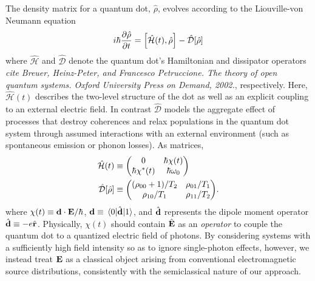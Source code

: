 \documentclass[conference]{IEEEtran}
\begin{document}
The density matrix for a quantum dot, $\hat{\rho}$, evolves according to the Liouville-von Neumann equation
\begin{equation}
  i \hbar \pdv{\hat{\rho}}{t} = \commutator{\hat{\mathcal{H}}(t)}{\hat{\rho}} - \hat{\mathcal{D}}\qty[\hat{\rho}]
  \label{eq:liouville}
\end{equation}
where $\hat{\mathcal{H}}$ and $\hat{\mathcal{D}}$ denote the quantum dot's Hamiltonian and dissipator operators {\it cite Breuer, Heinz-Peter, and Francesco Petruccione. The theory of open quantum systems. Oxford University Press on Demand, 2002.}, respectively.
Here, $\hat{\mathcal{H}}(t)$ describes the  two-level structure of the dot as well as an explicit coupling to an external electric field.
In contrast $\hat{\mathcal{D}}$ models the aggregate effect of processes that destroy coherences and relax populations in the quantum dot system through assumed interactions with an external environment (such as spontaneous emission or phonon losses).
As matrices,
\begin{subequations}
  \begin{align}
    \hat{\mathcal{H}}(t) &\equiv \mqty(0 & \hbar \chi(t) \\ \hbar \chi^*(t) & \hbar \omega_0) \label{eq:hamiltonian} \\
    \hat{\mathcal{D}}[\hat{\rho}] &\equiv \mqty((\rho_{00} + 1)/T_2 & \rho_{01}/T_1 \\ \rho_{10}/T_1 & \rho_{11}/T_2). \label{eq:dissipator}
  \end{align}
\end{subequations}
where $\chi(t) \equiv \vb{d} \cdot \vb{E}/\hbar$, $\vb{d} \equiv \matrixel{0}{\hat{\vb{d}}}{1}$, and $\hat{\vb{d}}$ represents the dipole moment operator $\hat{\vb{d}} \equiv -e \hat{\vb{r}}$. 
Physically, $\chi(t)$ should contain $\hat{\vb{E}}$ as an \emph{operator} to couple the quantum dot to a quantized electric field of photons.
By considering systems with a sufficiently high field intensity so as to ignore single-photon effects, however, we instead treat $\vb{E}$ as a classical object arising from conventional electromagnetic source distributions, consistently with the semiclassical nature of our approach.
\end{document}
